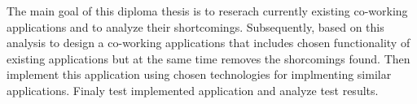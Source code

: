 The main goal of this diploma thesis is to reserach currently existing co-working applications and to analyze their shortcomings. Subsequently, based on this analysis to design a co-working applications that includes chosen functionality of existing applications but at the same time removes the shorcomings found. Then implement this application using chosen technologies for implmenting similar applications. Finaly test implemented application and analyze test results.
